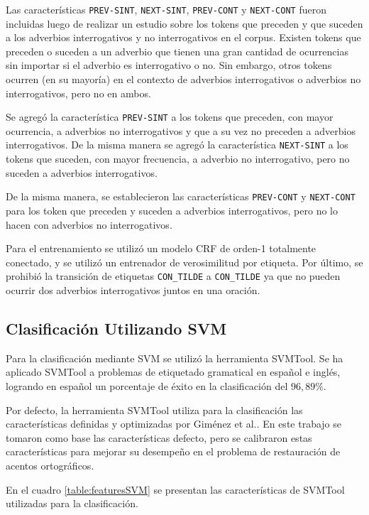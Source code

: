 \documentclass[runningheads,a4paper]{llncs}
\begin{document}
Las características \texttt{\small PREV-SINT}, \texttt{\small NEXT-SINT}, \texttt{\small PREV-CONT} y \texttt{\small NEXT-CONT} fueron incluidas luego de realizar un estudio sobre los tokens que preceden y que suceden a los adverbios interrogativos y no interrogativos en el corpus. Existen tokens que preceden o suceden a un adverbio que tienen una gran cantidad de ocurrencias sin importar si el adverbio es interrogativo o no. Sin embargo, otros tokens ocurren (en su mayoría) en el contexto de adverbios interrogativos o adverbios no interrogativos, pero no en ambos.

Se agregó la característica \texttt{\small PREV-SINT} a los tokens que preceden, con mayor ocurrencia, a adverbios no interrogativos y que a su vez no preceden a adverbios interrogativos. De la misma manera se agregó la característica \texttt{\small NEXT-SINT} a los tokens que suceden, con mayor frecuencia, a adverbio no interrogativo, pero no suceden a adverbios interrogativos.

De la misma manera, se establecieron las características \texttt{\small PREV-CONT} y \texttt{\small NEXT-CONT} para los token que preceden y suceden a adverbios interrogativos, pero no lo hacen con adverbios no interrogativos.

Para el entrenamiento se utilizó un modelo CRF de orden-1 totalmente conectado, y se utilizó un entrenador de verosimilitud por etiqueta. Por último, se prohibió la transición de etiquetas \texttt{\small CON\_TILDE} a \texttt{\small CON\_TILDE} ya que no pueden ocurrir dos adverbios interrogativos juntos en una oración. 

\subsection{Clasificación Utilizando SVM}
Para la clasificación mediante SVM se utilizó la herramienta SVMTool. Se ha aplicado SVMTool a problemas de etiquetado gramatical en español e ingl\'es, logrando en español un porcentaje de éxito en la clasificación del $96,89\%$\cite{GIMENEZ04}.

Por defecto, la herramienta SVMTool utiliza para la clasificación las ca\-rac\-te\-rís\-ti\-cas definidas y optimizadas por Giménez et al.\cite{GIMENEZ04}. En este trabajo se tomaron como base las caracter\'isticas defecto, pero se calibraron estas caracter\'isticas para mejorar su desempeño en el problema de restauración de acentos ortográficos.

En el cuadro \ref{table:featuresSVM} se presentan las características de SVMTool utilizadas para la clasificación.
\end{document}
